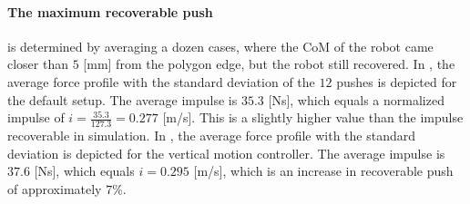 \paragraph{The maximum recoverable push} is determined by averaging a dozen cases, where the \ac{CoM} of the robot came closer than $5$ [mm] from the polygon edge, but the robot still recovered. In , the average force profile with the standard deviation of the $12$ pushes is depicted for the default setup. The average impulse is $35.3$ [Ns], which equals a normalized impulse of $i=\frac{35.3}{127.3}=0.277$ [m/s]. This is a slightly higher value than the impulse recoverable in simulation. In , the average force profile with the standard deviation is depicted for the vertical motion controller. The average impulse is $37.6$ [Ns], which equals $i=0.295$ [m/s], which is an increase in recoverable push of approximately $7$\%.
